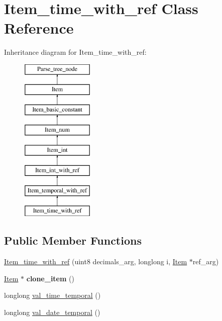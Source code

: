 \hypertarget{classItem__time__with__ref}{}\section{Item\+\_\+time\+\_\+with\+\_\+ref Class Reference}
\label{classItem__time__with__ref}
Inheritance diagram for Item\+\_\+time\+\_\+with\+\_\+ref\+:\begin{figure}[H]
\begin{center}
\leavevmode
\includegraphics[height=8.000000cm]{classItem__time__with__ref}
\end{center}
\end{figure}
\subsection*{Public Member Functions}
\begin{DoxyCompactItemize}
\item 
\mbox{\hyperlink{classItem__time__with__ref_a8840e1026f63c606fe558ed6b5fe3ee9}{Item\+\_\+time\+\_\+with\+\_\+ref}} (uint8 decimals\+\_\+arg, longlong i, \mbox{\hyperlink{classItem}{Item}} $\ast$ref\+\_\+arg)
\item 
\mbox{\label{classItem__time__with__ref_aad7ecbedff654fff22a434932a2b04fe}} 
\mbox{\hyperlink{classItem}{Item}} $\ast$ {\bfseries clone\+\_\+item} ()
\item 
longlong \mbox{\hyperlink{classItem__time__with__ref_a9e41e41a7136e706ac9182203ea3063f}{val\+\_\+time\+\_\+temporal}} ()
\item 
longlong \mbox{\hyperlink{classItem__time__with__ref_a1137ceb3bed39b0ff416f5534bd5b18d}{val\+\_\+date\+\_\+temporal}} ()
\end{DoxyCompactItemize}
